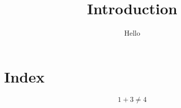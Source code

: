 \documentclass{article}
\begin{document}
\title{Introduction}
\author{Hello}
\maketitle
\section{Index}
$$ 1 + 3 \neq 4 $$
\end{document}
